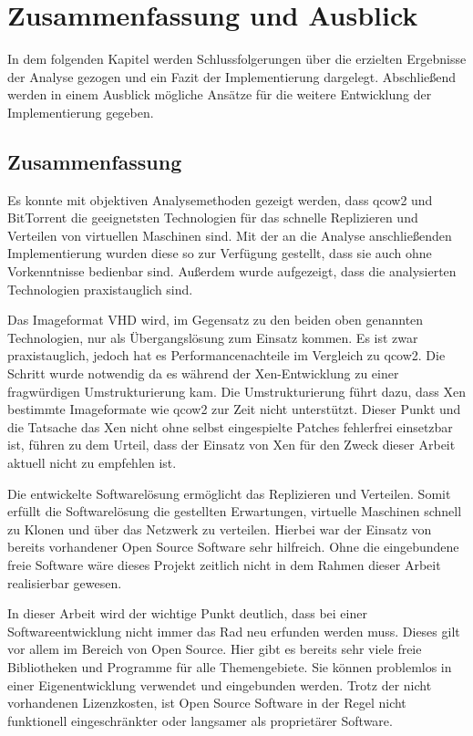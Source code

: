 \chapter{Zusammenfassung und Ausblick} 
In dem folgenden Kapitel werden Schlussfolgerungen über die erzielten Ergebnisse der Analyse gezogen und ein Fazit der Implementierung dargelegt. Abschließend werden in einem Ausblick mögliche Ansätze für die weitere Entwicklung der Implementierung gegeben.

\section{Zusammenfassung}
Es konnte mit objektiven Analysemethoden gezeigt werden, dass qcow2 und BitTorrent die geeignetsten Technologien für das schnelle Replizieren und Verteilen von virtuellen Maschinen sind. Mit der an die Analyse anschließenden Implementierung wurden diese so zur Verfügung gestellt, dass sie auch ohne Vorkenntnisse bedienbar sind. Außerdem wurde aufgezeigt, dass die analysierten Technologien praxistauglich sind.

Das Imageformat VHD wird, im Gegensatz zu den beiden oben genannten Technologien, nur als Übergangslösung zum Einsatz kommen. Es ist zwar praxistauglich, jedoch hat es Performancenachteile im Vergleich zu qcow2. Die Schritt wurde notwendig da es während der Xen-Entwicklung zu einer fragwürdigen Umstrukturierung kam. Die Umstrukturierung führt dazu, dass Xen bestimmte Imageformate wie qcow2 zur Zeit nicht unterstützt. Dieser Punkt und die Tatsache das Xen nicht ohne selbst eingespielte Patches fehlerfrei einsetzbar ist, führen zu dem Urteil, dass der Einsatz von Xen für den Zweck dieser Arbeit aktuell nicht zu empfehlen ist.

Die entwickelte Softwarelösung ermöglicht das Replizieren und Verteilen. Somit erfüllt die Softwarelösung die gestellten Erwartungen, virtuelle Maschinen schnell zu Klonen und über das Netzwerk zu verteilen. Hierbei war der Einsatz von bereits vorhandener Open Source Software sehr hilfreich. Ohne die eingebundene freie Software wäre dieses Projekt zeitlich nicht in dem Rahmen dieser Arbeit realisierbar gewesen.

In dieser Arbeit wird der wichtige Punkt deutlich, dass bei einer Softwareentwicklung nicht immer das Rad neu erfunden werden muss. Dieses gilt vor allem im Bereich von Open Source. Hier gibt es bereits sehr viele freie Bibliotheken und Programme für alle Themengebiete. Sie können problemlos in einer Eigenentwicklung verwendet und eingebunden werden. Trotz der nicht vorhandenen Lizenzkosten, ist Open Source Software in der Regel nicht funktionell eingeschränkter oder langsamer als proprietärer Software.

